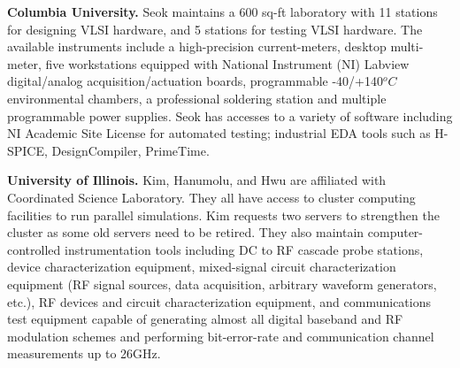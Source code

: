 \noindent
\textbf{Columbia University.} 
Seok maintains a 600 sq-ft laboratory with 11 stations for designing VLSI hardware, and 5 stations for testing VLSI hardware. 
The available instruments include a high-precision current-meters, desktop multi-meter, five workstations equipped with National Instrument (NI) Labview digital/analog acquisition/actuation boards, programmable -40/+140$^oC$ environmental chambers, a professional soldering station and multiple programmable power supplies. 
Seok has accesses to a variety of software including NI Academic Site License for automated testing; industrial EDA tools such as H-SPICE, DesignCompiler, PrimeTime. %

\vspace{3pt}
\noindent
\textbf{University of Illinois.}
Kim, Hanumolu, and Hwu are affiliated with Coordinated Science Laboratory. 
They all have access to cluster computing facilities to run parallel simulations. 
Kim requests two servers to strengthen the cluster as some old servers need to be retired. 
They also maintain computer-controlled instrumentation tools including DC to RF cascade probe stations, device characterization equipment, 
mixed-signal circuit characterization equipment (RF signal sources, data acquisition, arbitrary waveform generators, etc.), RF devices and circuit characterization equipment, 
and communications test equipment capable of generating almost all digital baseband and RF modulation schemes and performing bit-error-rate and communication channel measurements up to 26GHz. 

